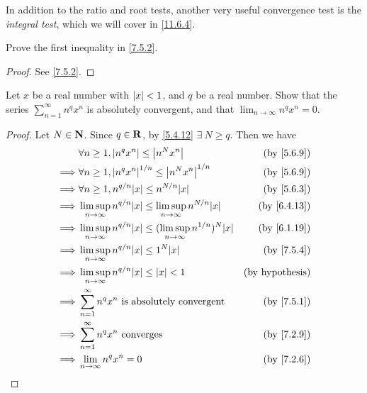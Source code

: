 \begin{remark}\label{7.5.5}
  In addition to the ratio and root tests, another very useful convergence test is the \emph{integral test}, which we will cover in \cref{11.6.4}.
\end{remark}

\exercisesection

\begin{exercise}\label{ex 7.5.1}
  Prove the first inequality in \cref{7.5.2}.
\end{exercise}

\begin{proof}
  See \cref{7.5.2}.
\end{proof}

\begin{exercise}\label{ex 7.5.2}
  Let \(x\) be a real number with \(\left\lvert x\right\rvert < 1\), and \(q\) be a real number.
  Show that the series \(\sum_{n = 1}^\infty n^q x^n\) is absolutely convergent, and that \(\lim_{n \to \infty} n^q x^n = 0\).
\end{exercise}

\begin{proof}
  Let \(N \in \mathbf{N}\).
  Since \(q \in \mathbf{R}\), by \cref{5.4.12} \(\exists\ N \geq q\).
  Then we have
  \begin{align*}
             & \forall n \geq 1, \abs{n^q x^n} \leq \abs{n^N x^n}                                         & \text{(by \cref{5.6.9})}  \\
    \implies & \forall n \geq 1, \abs{n^q x^n}^{1 / n} \leq \abs{n^N x^n}^{1 / n}                         & \text{(by \cref{5.6.9})}  \\
    \implies & \forall n \geq 1, n^{q / n} \abs{x} \leq n^{N / n} \abs{x}                                 & \text{(by \cref{5.6.3})}  \\
    \implies & \limsup_{n \to \infty} n^{q / n} \abs{x} \leq \limsup_{n \to \infty} n^{N / n} \abs{x}     & \text{(by \cref{6.4.13})} \\
    \implies & \limsup_{n \to \infty} n^{q / n} \abs{x} \leq (\limsup_{n \to \infty} n^{1 / n})^N \abs{x} & \text{(by \cref{6.1.19})} \\
    \implies & \limsup_{n \to \infty} n^{q / n} \abs{x} \leq 1^N \abs{x}                                  & \text{(by \cref{7.5.4})}  \\
    \implies & \limsup_{n \to \infty} n^{q / n} \abs{x} \leq \abs{x} < 1                                  & \text{(by hypothesis)}    \\
    \implies & \sum_{n = 1}^\infty n^q x^n \text{ is absolutely convergent}                               & \text{(by \cref{7.5.1})}  \\
    \implies & \sum_{n = 1}^\infty n^q x^n \text{ converges}                                              & \text{(by \cref{7.2.9})}  \\
    \implies & \lim_{n \to \infty} n^q x^n = 0                                                            & \text{(by \cref{7.2.6})}
  \end{align*}
\end{proof}

